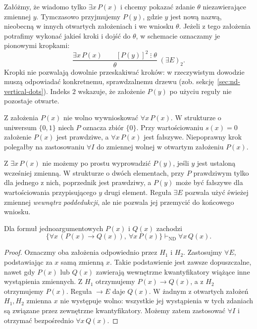 \begin{przyklad}
Załóżmy, że wiadomo tylko $\exists x\,P(x)$ i chcemy pokazać
zdanie $\theta$ niezawierające zmiennej $y$.
Tymczasowo przyjmujemy $P(y)$, gdzie $y$ jest nową nazwą,
nieobecną w innych otwartych założeniach i we wniosku $\theta$.
Jeżeli z tego założenia potrafimy wykonać jakieś kroki i dojść
do $\theta$, w schemacie oznaczamy je pionowymi kropkami:
\[
\frac{\exists x\,P(x)\qquad [P(y)]^2\;\vdots\;\theta}
{\theta}\;(\exists E)_2.
\]
Kropki nie pozwalają dowolnie przeskakiwać kroków: w rzeczywistym dowodzie
muszą odpowiadać konkretnemu, sprawdzalnemu drzewu
(zob. sekcję~\ref{sec:nd-vertical-dots}). Indeks $2$ wskazuje,
że założenie $P(y)$ po użyciu reguły nie pozostaje otwarte.
\end{przyklad}

\begin{przyklad}
Z założenia $P(x)$ nie wolno wywnioskować $\forall x\,P(x)$.
W strukturze o uniwersum $\{0,1\}$ niech $P$ oznacza zbiór $\{0\}$.
Przy wartościowaniu $s(x)=0$ założenie $P(x)$ jest prawdziwe,
a $\forall x\,P(x)$ jest fałszywe. Niepoprawny krok
polegałby na zastosowaniu $\forall I$ do zmiennej wolnej
w otwartym założeniu $P(x)$.
\end{przyklad}

\begin{przyklad}
Z $\exists x\,P(x)$ nie możemy po prostu wyprowadzić
$P(y)$, jeśli $y$ jest ustaloną wcześniej zmienną.
W strukturze o dwóch elementach, przy $P$ prawdziwym
tylko dla jednego z nich, poprzednik jest prawdziwy,
a $P(y)$ może być fałszywe dla wartościowania przypisującego
$y$ drugi element. Reguła $\exists E$ pozwala użyć
świeżej zmiennej \emph{wewnątrz poddedukcji}, ale nie
pozwala jej przemycić do końcowego wniosku.
\end{przyklad}

\begin{twierdzenie}
\label{thm:nd-univ-chain}
Dla formuł jednoargumentowych $P(x)$ i $Q(x)$ zachodzi
\[
\bigl\{\forall x\,(P(x)\to Q(x)),\ \forall x\,P(x)\bigr\}
\vdash_{\mathrm{ND}}\forall x\,Q(x).
\]
\end{twierdzenie}
\begin{proof}
Oznaczmy oba założenia odpowiednio przez $H_1$ i $H_2$.
Zastosujmy $\forall E$, podstawiając za $x$ samą
zmienną $x$. Takie podstawienie jest zawsze dopuszczalne,
nawet gdy $P(x)$ lub $Q(x)$ zawierają wewnętrzne
kwantyfikatory wiążące inne wystąpienia zmiennych.
Z $H_1$ otrzymujemy $P(x)\to Q(x)$,
a z $H_2$ otrzymujemy $P(x)$.
Reguła $\to E$ daje $Q(x)$.
W żadnym z otwartych założeń $H_1,H_2$ zmienna $x$
nie występuje wolno: wszystkie jej wystąpienia
w tych zdaniach są związane przez zewnętrzne kwantyfikatory.
Możemy zatem zastosować $\forall I$ i otrzymać
bezpośrednio $\forall x\,Q(x)$.
\end{proof}

